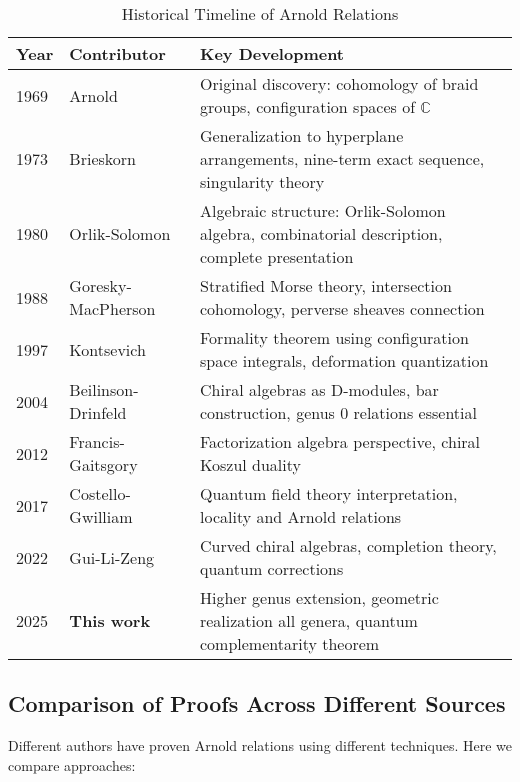 \begin{table}[H]
\centering
\caption{Historical Timeline of Arnold Relations}
\begin{tabular}{|l|l|p{7cm}|}
\hline
\textbf{Year} & \textbf{Contributor} & \textbf{Key Development} \\
\hline
\hline
1969 & Arnold \cite{Arnold69} & 
Original discovery: cohomology of braid groups, configuration spaces of $\mathbb{C}$ \\
\hline
1973 & Brieskorn \cite{Brieskorn73} & 
Generalization to hyperplane arrangements, nine-term exact sequence, singularity theory \\
\hline
1980 & Orlik-Solomon \cite{OrlikSolomon80} & 
Algebraic structure: Orlik-Solomon algebra, combinatorial description, complete presentation \\
\hline
1988 & Goresky-MacPherson \cite{GoMa92} & 
Stratified Morse theory, intersection cohomology, perverse sheaves connection \\
\hline
1997 & Kontsevich \cite{Kontsevich97} & 
Formality theorem using configuration space integrals, deformation quantization \\
\hline
2004 & Beilinson-Drinfeld \cite{BD04} & 
Chiral algebras as D-modules, bar construction, genus 0 relations essential \\
\hline
2012 & Francis-Gaitsgory \cite{FG-factorization} & 
Factorization algebra perspective, chiral Koszul duality \\
\hline
2017 & Costello-Gwilliam \cite{CG17} & 
Quantum field theory interpretation, locality and Arnold relations \\
\hline
2022 & Gui-Li-Zeng \cite{GLZ22} & 
Curved chiral algebras, completion theory, quantum corrections \\
\hline
2025 & \textbf{This work} & 
Higher genus extension, geometric realization all genera, quantum complementarity theorem \\
\hline
\end{tabular}
\end{table}

\subsection{Comparison of Proofs Across Different Sources}

Different authors have proven Arnold relations using different techniques. Here we 
compare approaches:

